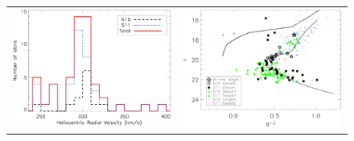 \documentclass{emulateapj}
\begin{document}
\begin{figure}
 \begin{center}
  \begin{tabular}{cc}
    \includegraphics[width=8.5cm,clip=true,bbllx=70, bblly=362,bburx=545, bbury=714]{velhist.ps} & 
    \includegraphics[width=8.5cm,clip=true,bbllx=12, bblly=178,bburx=600, bbury=613]{cm_2_withhb_2.ps} \\


\end{tabular}
\end{center}
\end{figure}
\end{document}
